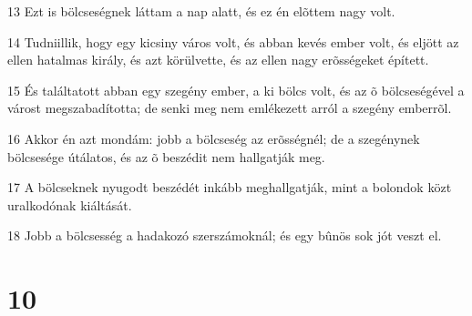 \par 13 Ezt is bölcseségnek láttam a nap alatt, és ez én elõttem nagy volt.
\par 14 Tudniillik, hogy egy kicsiny város volt, és abban kevés ember volt, és eljött az ellen hatalmas király, és azt körülvette, és az ellen nagy erõsségeket épített.
\par 15 És találtatott abban egy szegény ember, a ki bölcs volt, és az õ bölcseségével a várost megszabadította; de senki meg nem emlékezett arról a szegény emberrõl.
\par 16 Akkor én azt mondám: jobb a bölcseség az erõsségnél; de a szegénynek bölcsesége útálatos, és az õ beszédit nem hallgatják meg.
\par 17 A bölcseknek nyugodt beszédét inkább meghallgatják, mint a bolondok közt uralkodónak kiáltását.
\par 18 Jobb a bölcsesség a hadakozó szerszámoknál; és egy bûnös sok jót veszt el.

\chapter{10}

